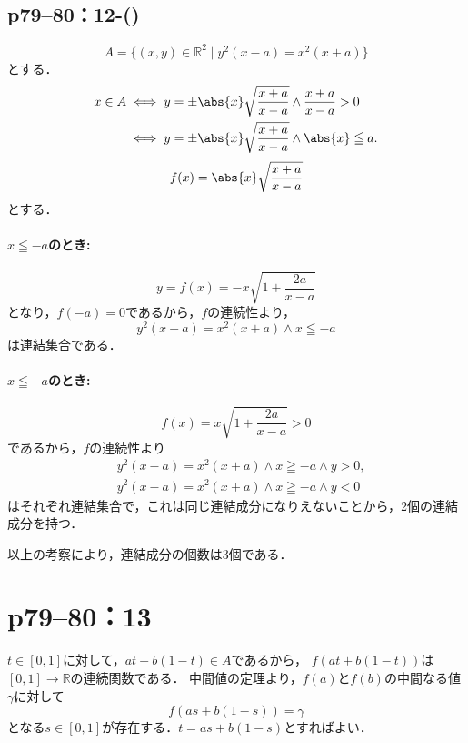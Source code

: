 \subsection*{p79--80：12-()} \label{p79--80：12-(\romannumeral4)}

\begin{tanswer}
    \[
        A = \{ (x,y) \in \mathbb{R}^2 \mid y^2(x-a)=x^2(x+a) \}
    \]
    とする．
    \begin{align*}
        x \in A & \iff y= \pm \abs{x}\sqrt{\frac{x+a}{x-a}} \land \frac{x+a}{x-a} >0 \\
                & \iff y= \pm \abs{x}\sqrt{\frac{x+a}{x-a}} \land \abs{x} \leqq a .
    \end{align*}
    \[
        f(x)=\abs{x}\sqrt{\frac{x+a}{x-a}}
    \]
    とする．

    \paragraph{$x \leqq -a$のとき:}
    \[
        y=f(x)=-x \sqrt{1+\frac{2a}{x-a}}
    \]
    となり，$f(-a)=0$であるから，$f$の連続性より，
    \[
        y^2(x-a)=x^2(x+a) \land x \leqq -a
    \]
    は連結集合である．

    \paragraph{$x \leqq -a$のとき:}
    \[
        f(x)=x \sqrt{1+\frac{2a}{x-a}} >0
    \]
    であるから，$f$の連続性より
    \begin{align*}
         & y^2(x-a)=x^2(x+a) \land x \geqq -a \land y >0 , \\
         & y^2(x-a)=x^2(x+a) \land x \geqq -a \land y <0
    \end{align*}
    はそれぞれ連結集合で，これは同じ連結成分になりえないことから，2個の連結成分を持つ．

    以上の考察により，連結成分の個数は3個である．
\end{tanswer}


\section*{p79--80：13} \label{p79--80：13}
\begin{tproof}
    $ t \in [0,1]$に対して，$at +b(1-t) \in A$であるから，
    $f(at +b(1-t))$は$[0,1] \longrightarrow \mathbb{R}$の連続関数である．
    中間値の定理より，$f(a)$と$f(b)$の中間なる値$\gamma$に対して
    \[
        f(as +b(1-s)) = \gamma
    \]
    となる$s \in [0,1]$が存在する．$t=as+b(1-s)$とすればよい．
\end{tproof}
